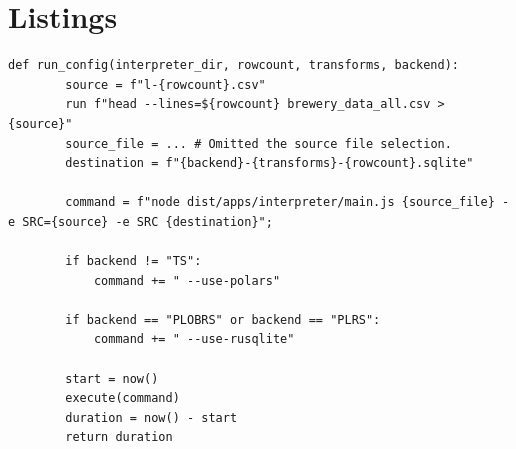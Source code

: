\section{Listings}

\begin{listing}[H]
	\begin{verbatim}
def run_config(interpreter_dir, rowcount, transforms, backend):
		source = f"l-{rowcount}.csv"
		run f"head --lines=${rowcount} brewery_data_all.csv > {source}"
		source_file = ... # Omitted the source file selection.
		destination = f"{backend}-{transforms}-{rowcount}.sqlite"

		command = f"node dist/apps/interpreter/main.js {source_file} -e SRC={source} -e SRC {destination}";

		if backend != "TS":
			command += " --use-polars"

		if backend == "PLOBRS" or backend == "PLRS":
			command += " --use-rusqlite"

		start = now()
		execute(command)
		duration = now() - start
		return duration
	\end{verbatim}
	\caption{Pseudocode illustrating the manner in which the evaluation tool executes a configuration}
	\label{lst:run_config}
\end{listing}
